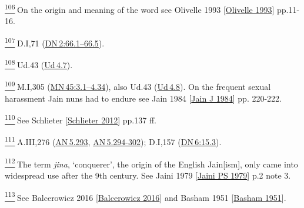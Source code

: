 \label{footprints_split_024.html_fn106}
\hyperref[footprints_split_007.htmlux5cux23fnref106]{\textsuperscript{106}} On
the origin and meaning of the word see {Olivelle 1993
{{[}\hyperref[footprints_split_022.htmlux5cux23Olivelleux5cux25201993]{Olivelle
1993}{]}}} pp.11-16.

\label{footprints_split_024.html_fn107}
\hyperref[footprints_split_007.htmlux5cux23fnref107]{\textsuperscript{107}} D.I,71
(\href{https://suttacentral.net/dn2/en/sujato\#66.1}{DN\,2:66.1--66.5}).

\label{footprints_split_024.html_fn108}
\hyperref[footprints_split_007.htmlux5cux23fnref108]{\textsuperscript{108}} Ud.43
(\href{https://suttacentral.net/ud4.7/en/sujato}{Ud\,4.7}).

\label{footprints_split_024.html_fn109}
\hyperref[footprints_split_007.htmlux5cux23fnref109]{\textsuperscript{109}} M.I,305
(\href{https://suttacentral.net/mn45/en/sujato\#3.1}{MN\,45:3.1--4.34}),
also Ud.43 (\href{https://suttacentral.net/ud4.8/en/sujato}{Ud\,4.8}).
On the frequent sexual harassment Jain nuns had to endure see {Jain 1984
{{[}\hyperref[footprints_split_022.htmlux5cux23Jainux5cux2520Jux5cux25201984]{Jain
J 1984}{]}}} pp. 220-222.

\label{footprints_split_024.html_fn110}
\hyperref[footprints_split_007.htmlux5cux23fnref110]{\textsuperscript{110}} See
{Schlieter
{{[}\hyperref[footprints_split_022.htmlux5cux23Schlieterux5cux25202012]{Schlieter
2012}{]}}} pp.137 ff.

\label{footprints_split_024.html_fn111}
\hyperref[footprints_split_007.htmlux5cux23fnref111]{\textsuperscript{111}} A.III,276
(\href{https://suttacentral.net/an5.293/en/sujato}{AN\,5.293},
\href{https://suttacentral.net/an5.294-302/en/sujato}{AN\,5.294-302});
D.I,157
(\href{https://suttacentral.net/dn6/en/sujato\#15.3}{DN\,6:15.3}).

\label{footprints_split_024.html_fn112}
\hyperref[footprints_split_007.htmlux5cux23fnref112]{\textsuperscript{112}} The
term \emph{jina}, `conquerer', the origin of the English Jain{[}ism{]},
only came into widespread use after the 9{th} century. See {Jaini 1979
{{[}\hyperref[footprints_split_022.htmlux5cux23Jainiux5cux2520PSux5cux25201979]{Jaini
PS 1979}{]}}} p.2 note 3.

\label{footprints_split_024.html_fn113}
\hyperref[footprints_split_007.htmlux5cux23fnref113]{\textsuperscript{113}} See
{Balcerowicz 2016
{{[}\hyperref[footprints_split_022.htmlux5cux23Balcerowiczux5cux25202016]{Balcerowicz
2016}{]}}} and {Basham 1951
{{[}\hyperref[footprints_split_022.htmlux5cux23Bashamux5cux25201951]{Basham
1951}{]}}}.


